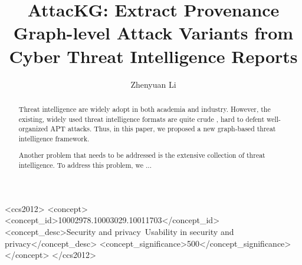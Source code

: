 \documentclass[sigconf, anonymous]{acmart}
\begin{document}
\fancyhead{}

\title{AttacKG: Extract Provenance Graph-level Attack Variants from Cyber Threat Intelligence Reports} %

\vspace{-0.1in}
\author{Zhenyuan Li} %

\begin{abstract}

Threat intelligence are widely adopt in both academia and industry. However, the existing, widely used threat intelligence formats are quite crude \cite{Li2019}, hard to defent well-organized APT attacks. Thus, in this paper, we proposed a new graph-based threat intelligence framework.

Another problem that needs to be addressed is the extensive collection of threat intelligence. To address this problem, we ...

\end{abstract}

\begin{CCSXML}
<ccs2012>
<concept>
<concept_id>10002978.10003029.10011703</concept_id>
<concept_desc>Security and privacy~Usability in security and privacy</concept_desc>
<concept_significance>500</concept_significance>
</concept>
</ccs2012>
\end{CCSXML}



\maketitle









\end{document}
